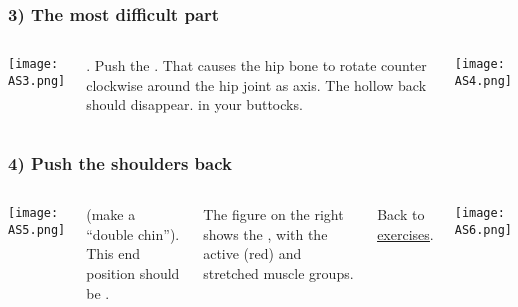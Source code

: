 \begin{frame}
\frametitle{3) The most difficult part}
\begin{columns}[c] %

	\texttt{[image: AS3.png]}


. Push the . That causes the hip bone to rotate counter clockwise around the hip joint as axis. The hollow back should disappear.  in your buttocks.


	\texttt{[image: AS4.png]}
\end{columns}
\end{frame}
\begin{frame}
\frametitle{4) Push the shoulders back}
\begin{columns}[c] %

	\texttt{[image: AS5.png]}


 (make a ``double chin''). This end position should be . 

The figure on the right shows the , with the active (red) and stretched muscle groups.

\vspace{1cm}
Back to \href{run:./Exercises.pdf}{\underline{exercises}}.

	\texttt{[image: AS6.png]}
\end{columns}
\end{frame}